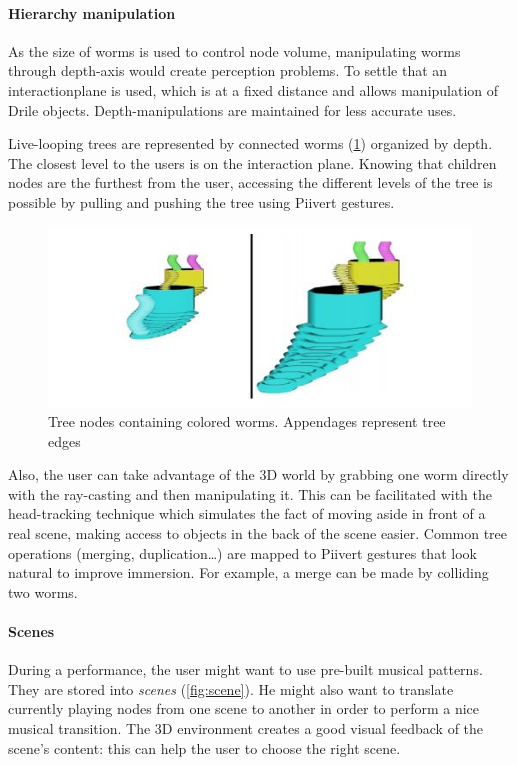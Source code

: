 \paragraph{Hierarchy manipulation}  
As the size of worms is used to control node volume, manipulating worms through depth-axis would create perception problems. To settle that an \gls{interactionplane} is used, which is at a fixed distance and allows manipulation of Drile objects. Depth-manipulations are maintained for less accurate uses.

Live-looping trees are represented by connected worms (\ref{fig:worm}) organized by depth. The closest level to the users is on the interaction plane.
Knowing that children nodes are the furthest from the user, accessing the different levels of the tree is possible by pulling and pushing the tree using Piivert gestures. 

\begin{figure}[h!]
\centering\includegraphics[scale=0.55]{image/worm.JPG}
\caption{Tree nodes containing colored worms. Appendages represent tree edges}
\label{fig:worm}
\end{figure} 

Also, the user can take advantage of the 3D world by grabbing one worm directly with the ray-casting and then manipulating it. This can be facilitated with the head-tracking technique which simulates the fact of moving aside in front of a real scene, making access to objects in the back of the scene easier. 
Common tree operations (merging, duplication\dots ) are mapped to Piivert gestures that look natural to improve immersion. For example, a merge can be made by colliding two worms.

\paragraph{Scenes}  
During a performance, the user might want to use pre-built musical patterns. They are stored into \textit{scenes} (\ref{fig:scene}). He might also want to translate currently playing nodes from one scene to another in order to perform a nice musical transition. The 3D environment creates a good visual feedback of the scene's content: this can help the user to choose the right scene.

